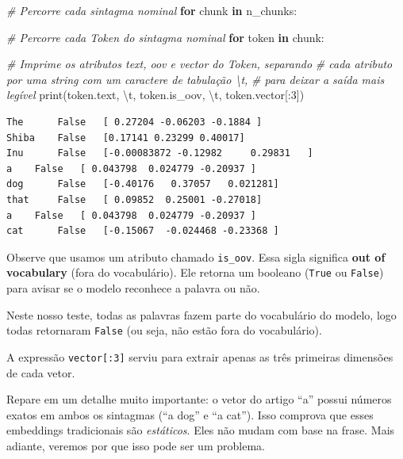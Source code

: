 \documentclass[
  brazilian,
]{article}
\newenvironment{Shaded}{}{}
\newcommand{\BuiltInTok}[1]{#1}
\newcommand{\CharTok}[1]{\textcolor[rgb]{0.25,0.44,0.63}{#1}}
\newcommand{\CommentTok}[1]{\textcolor[rgb]{0.38,0.63,0.69}{\textit{#1}}}
\newcommand{\ControlFlowTok}[1]{\textcolor[rgb]{0.00,0.44,0.13}{\textbf{#1}}}
\newcommand{\DecValTok}[1]{\textcolor[rgb]{0.25,0.63,0.44}{#1}}
\newcommand{\KeywordTok}[1]{\textcolor[rgb]{0.00,0.44,0.13}{\textbf{#1}}}
\newcommand{\NormalTok}[1]{#1}
\newcommand{\StringTok}[1]{\textcolor[rgb]{0.25,0.44,0.63}{#1}}
\begin{document}
\begin{Shaded}
\begin{Highlighting}[]
\CommentTok{\# Percorre cada sintagma nominal}
\ControlFlowTok{for}\NormalTok{ chunk }\KeywordTok{in}\NormalTok{ n\_chunks:}
    
    \CommentTok{\# Percorre cada Token do sintagma nominal}
    \ControlFlowTok{for}\NormalTok{ token }\KeywordTok{in}\NormalTok{ chunk:}
        
        \CommentTok{\# Imprime os atributos \textquotesingle{}text\textquotesingle{}, \textquotesingle{}oov\textquotesingle{} e \textquotesingle{}vector\textquotesingle{} do Token, separando}
        \CommentTok{\# cada atributo por uma string com um caractere de tabulação \textbackslash{}t,}
        \CommentTok{\# para deixar a saída mais legível}
        \BuiltInTok{print}\NormalTok{(token.text, }\StringTok{\textquotesingle{}}\CharTok{\textbackslash{}t}\StringTok{\textquotesingle{}}\NormalTok{, token.is\_oov, }\StringTok{\textquotesingle{}}\CharTok{\textbackslash{}t}\StringTok{\textquotesingle{}}\NormalTok{, token.vector[:}\DecValTok{3}\NormalTok{])}
\end{Highlighting}
\end{Shaded}

\begin{verbatim}
The      False   [ 0.27204 -0.06203 -0.1884 ]
Shiba    False   [0.17141 0.23299 0.40017]
Inu      False   [-0.00083872 -0.12982     0.29831   ]
a    False   [ 0.043798  0.024779 -0.20937 ]
dog      False   [-0.40176   0.37057   0.021281]
that     False   [ 0.09852  0.25001 -0.27018]
a    False   [ 0.043798  0.024779 -0.20937 ]
cat      False   [-0.15067  -0.024468 -0.23368 ]
\end{verbatim}

Observe que usamos um atributo chamado \texttt{is\_oov}. Essa sigla
significa \textbf{out of vocabulary} (fora do vocabulário). Ele retorna
um booleano (\texttt{True} ou \texttt{False}) para avisar se o modelo
reconhece a palavra ou não.

Neste nosso teste, todas as palavras fazem parte do vocabulário do
modelo, logo todas retornaram \texttt{False} (ou seja, não estão fora do
vocabulário).

A expressão \texttt{vector{[}:3{]}} serviu para extrair apenas as três
primeiras dimensões de cada vetor.

Repare em um detalhe muito importante: o vetor do artigo ``a'' possui
números exatos em ambos os sintagmas (``a dog'' e ``a cat''). Isso
comprova que esses embeddings tradicionais são \emph{estáticos}. Eles
não mudam com base na frase. Mais adiante, veremos por que isso pode ser
um problema.
\end{document}
